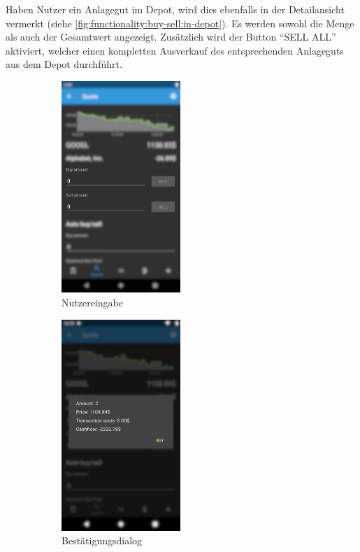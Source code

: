 \documentclass[a4paper]{article}
\begin{document}
Haben Nutzer ein Anlagegut im Depot, wird dies ebenfalls in der Detailansicht vermerkt (siehe \autoref{fig:functionality:buy-sell:in-depot}).
Es werden sowohl die Menge als auch der Gesamtwert angezeigt.
Zusätzlich wird der Button "`SELL ALL"' aktiviert, welcher einen kompletten Ausverkauf des entsprechenden Anlageguts aus dem Depot durchführt.

\begin{figure}[H]
	\begin{subfigure}{.5\textwidth}
		\centering
		\includegraphics[height=8cm,keepaspectratio]{./images/quote/buy_sell.png}
		\caption{Nutzereingabe}
		\label{fig:functionality:buy-sell:input}
	\end{subfigure}
	\begin{subfigure}{.5\textwidth}
		\centering
		\includegraphics[height=8cm,keepaspectratio]{./images/quote/buy_dialog.png}
		\caption{Bestätigungsdialog}
		\label{fig:functionality:buy-sell:dialog}
	\end{subfigure}
	\begin{subfigure}{.5\textwidth}

\end{subfigure}
\end{figure}
\end{document}
